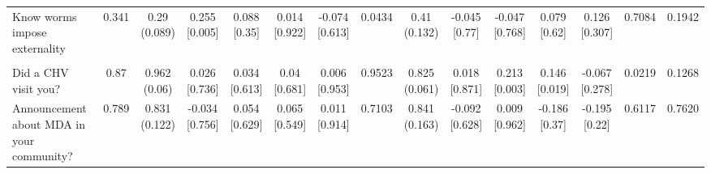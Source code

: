 \documentclass[
]{article}
\begin{document}
\begin{table}
{\begin{tabular}[t]{lcccccccccccccc}
\hspace{1em}Know worms impose externality & 0.341 & \makecell[c]{0.29\\(0.089)} & \makecell[c]{0.255\\{[0.005]}} & \makecell[c]{0.088\\{[0.35]}} & \makecell[c]{0.014\\{[0.922]}} & \makecell[c]{-0.074\\{[0.613]}} & 0.0434 & \makecell[c]{0.41\\(0.132)} & \makecell[c]{-0.045\\{[0.77]}} & \makecell[c]{-0.047\\{[0.768]}} & \makecell[c]{0.079\\{[0.62]}} & \makecell[c]{0.126\\{[0.307]}} & 0.7084 & 0.1942\\
\addlinespace[0.3em]
\hline
\multicolumn{15}{l}{\textit{\textbf{Panel D: Implementation, $N=252$}}}\\
\hline
\hspace{1em}Did a CHV visit you? & 0.87 & \makecell[c]{0.962\\(0.06)} & \makecell[c]{0.026\\{[0.736]}} & \makecell[c]{0.034\\{[0.613]}} & \makecell[c]{0.04\\{[0.681]}} & \makecell[c]{0.006\\{[0.953]}} & 0.9523 & \makecell[c]{0.825\\(0.061)} & \makecell[c]{0.018\\{[0.871]}} & \makecell[c]{0.213\\{[0.003]}} & \makecell[c]{0.146\\{[0.019]}} & \makecell[c]{-0.067\\{[0.278]}} & 0.0219 & 0.1268\\
\hspace{1em}Announcement about MDA in your community? & 0.789 & \makecell[c]{0.831\\(0.122)} & \makecell[c]{-0.034\\{[0.756]}} & \makecell[c]{0.054\\{[0.629]}} & \makecell[c]{0.065\\{[0.549]}} & \makecell[c]{0.011\\{[0.914]}} & 0.7103 & \makecell[c]{0.841\\(0.163)} & \makecell[c]{-0.092\\{[0.628]}} & \makecell[c]{0.009\\{[0.962]}} & \makecell[c]{-0.186\\{[0.37]}} & \makecell[c]{-0.195\\{[0.22]}} & 0.6117 & 0.7620\\

\end{tabular}}
\end{table}
\end{document}
